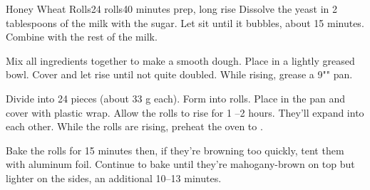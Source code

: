 \documentclass[../Cookbook.tex]{subfiles}
\begin{document}
\begin{recipe}[HoneyWheatRolls]{Honey Wheat Rolls}{24 rolls}{40 minutes prep, long rise}
\renewcommand*{\thefootnote}{\num{footnote}}
	Dissolve the yeast in 2 tablespoons of the milk with the sugar. Let sit until it bubbles, about 15 minutes.
	Combine with the rest of the milk.

	Mix all ingredients together to make a smooth dough.
	Place in a lightly greased bowl.
	Cover and let rise until not quite doubled.
	While rising, grease a 9"" pan.

	Divide into 24 pieces (about 33 g each).
	Form into rolls. Place in the pan and cover with plastic wrap. Allow the rolls to rise for 1 --2 hours. They'll expand into each other.
	While the rolls are rising, preheat the oven to .

	Bake the rolls for 15 minutes then, if they're browning too quickly, tent them with aluminum foil.
	Continue to bake until they're mahogany-brown on top but lighter on the sides, an additional 10--13 minutes.
\end{recipe}
\end{document}
